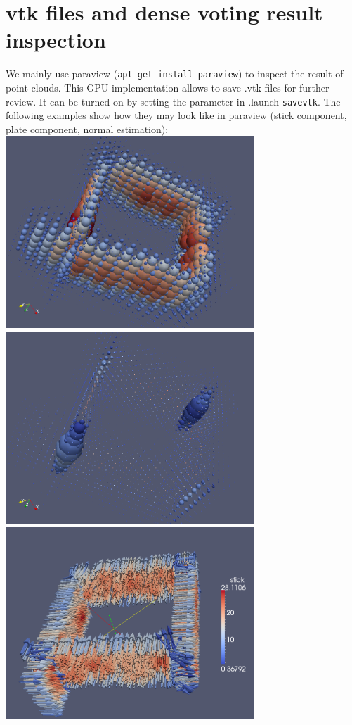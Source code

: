 \documentclass[a4paper, 11pt]{article}
\begin{document}
\section{vtk files and dense voting result inspection}
We mainly use paraview ({\tt apt-get install paraview}) to inspect the result of point-clouds.
This GPU implementation allows to save .vtk files for further review. It can be turned on by setting the parameter in .launch {\tt savevtk}.
The following examples show how they may look like in paraview (stick component, plate component, normal estimation):\\
{
\includegraphics[width=0.7\textwidth]{pv_stick}\\
\includegraphics[width=0.7\textwidth]{pv_plate}\\
\includegraphics[width=0.7\textwidth]{pv_normal}
}
\end{document}
